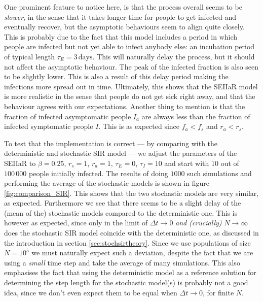 One prominent feature to notice here, is that the process overall seems to be \textit{slower}, in the sense that it takes longer time for people to get infected and eventually recover, but the asymptotic behaviours seem to align quite closely. This is probably due to the fact that this model includes a period in which people are infected but not yet able to infect anybody else: an incubation period of typical length $\tau_E = 3 \, \mathrm{days}$. This will naturally delay the process, but it should not affect the asymptotic behaviour. The peak of the infected fraction is also seen to be slightly lower. This is also a result of this delay period making the infections more spread out in time. Ultimately, this shows that the SEIIaR model is more realistic in the sense that people do not get sick right away, and that the behaviour agrees with our expectations. Another thing to mention is that the fraction of infected asymptomatic people $I_a$ are always less than the fraction of infected symptomatic people $I$. This is as expected since $f_a < f_s$ and $r_a < r_s$.

To test that the implementation is correct --- by comparing with the deterministic and stochastic SIR model --- we adjust the parameters of the SEIIaR to $\beta = 0.25$, $r_s = 1$, $r_a = 1$, $\tau_E = 0$, $\tau_I= 10$ and start with $10$ out of $100 \, 000$ people initially infected. The results of doing $1000$ such simulations and performing the average of the stochastic models is shown in figure \ref{fig:comparison_SIR}. This shows that the two stochastic models are very similar, as expected. Furthermore we see that there seems to be a slight delay of the (mean of the) stochastic models compared to the deterministic one. This is however as expected, since only in the limit of $\Delta t\to 0$ \textit{and (crucially)} $N\to \infty$ does the stochastic SIR model coincide with the deterministic one, as discussed in the introduction in section \ref{sec:stochsirtheory}. Since we use populations of size $N = 10^5$ we must naturally expect such a deviation, despite the fact that we are using a \textit{small} time step and take the average of many simulations. This also emphasises the fact that using the deterministic model as a reference solution for determining the step length for the stochastic model(s) is probably not a good idea, since we don't even expect them to be equal when $\Delta t \to 0$, for finite $N$. 

